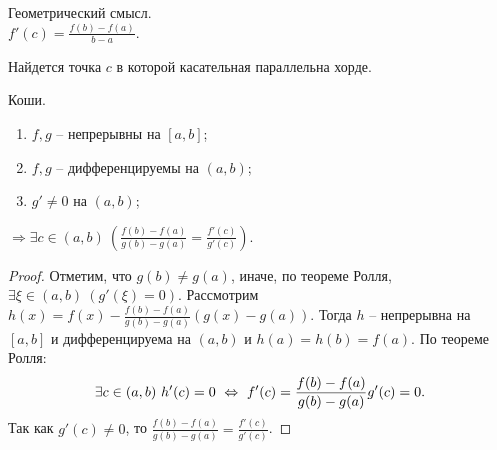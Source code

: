     \begin{note}{Геометрический смысл.}\\
        $f'(c) = \frac{f(b) - f(a)}{b - a}$.
        \begin{center}
        \end{center}
        Найдется точка $c$ в которой касательная параллельна хорде.
    \end{note}
    
    \begin{theorem}{Коши.}
        \begin{enumerate}
            \item $f, g$ -- непрерывны на $[a, b]$;
            \item $f, g$ -- дифференцируемы на $(a,b)$;
            \item $g' \neq 0$ на $(a,b)$;
        \end{enumerate}
        $\Rightarrow \exists c \in (a,b) \ (\frac{f(b) - f(a)}{g(b) - g(a)} = \frac{f'(c)}{g'(c)})$.
    \end{theorem}
    
    \begin{proof}
        Отметим, что $g(b) \neq g(a)$, иначе, по теореме Ролля, $\exists \xi \in (a,b) \ (g'(\xi) = 0)$. Рассмотрим $h(x)=f(x) - \frac{f(b) - f(a)}{g(b) - g(a)}(g(x) - g(a))$. Тогда $h$ -- непрерывна на $[a, b]$ и дифференцируема на $(a,b)$ и $h(a) = h(b) = f(a)$. По теореме Ролля:
        \[\exists c \in (a,b) \ h'(c) = 0 \ \lra \ f'(c) = \frac{f(b) - f(a)}{g(b) - g(a)}g'(c) = 0.\]
        Так как $g'(c) \neq 0$, то $\frac{f(b) - f(a)}{g(b) - g(a)} = \frac{f'(c)}{g'(c)}$.
    \end{proof}
    
